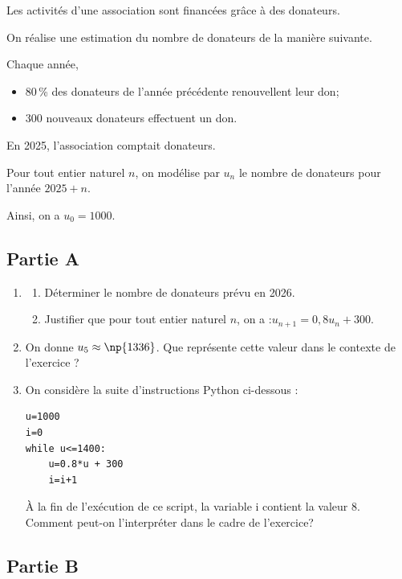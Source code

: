 Les activités d'une association sont financées grâce à des donateurs.

On réalise une estimation du nombre de donateurs de la manière suivante.

Chaque année,
\begin{itemize}[left=5mm]
	\item 80\,\% des donateurs de l'année précédente renouvellent leur don;
	\item 300 nouveaux donateurs effectuent un don.
\end{itemize}

En 2025, l'association comptait  donateurs.

Pour tout entier naturel $n$, on modélise par $u_{n}$ le nombre de donateurs pour l'année $2025+n$.

Ainsi, on a $u_{0}=1000$.

\subsection*{Partie A}

\begin{enumerate}
	\item \begin{enumerate}
		\item Déterminer le nombre de donateurs prévu en 2026.

		\item Justifier que pour tout entier naturel $n$, on a :\quad $u_{n+1}=0,8 u_{n}+300$.
	\end{enumerate}

	\item On donne $u_{5} \approx \np{1336}$. Que représente cette valeur dans le contexte de l'exercice ?

	\item On considère la suite d'instructions Python ci-dessous :

\begin{lstlisting}[style=python,xleftmargin=5cm,xrightmargin=5cm,numbers=none]
u=1000
i=0
while u<=1400:
	u=0.8*u + 300
	i=i+1
\end{lstlisting}

	À la fin de l'exécution de ce script, la variable i contient la valeur 8.\\
	Comment peut-on l'interpréter dans le cadre de l'exercice?
\end{enumerate}

\subsection*{Partie B}


